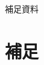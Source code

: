 \documentclass[12pt, dvipdfmx]{beamer}
\begin{document}

\appendix

\begin{frame}
	\LARGE{補足資料}
\end{frame}

\section{補足}




\end{document}
